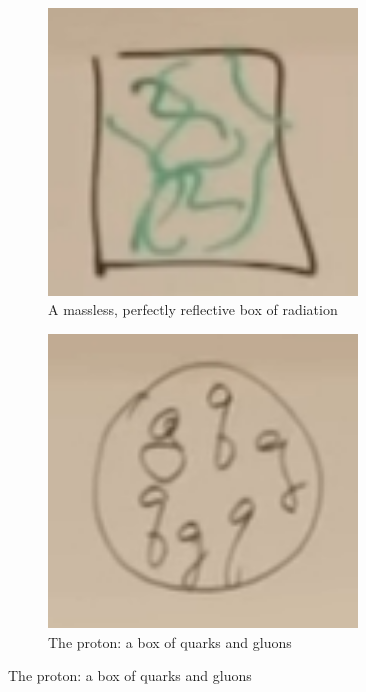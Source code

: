 \documentclass[]{article}
\begin{document}
\begin{figure}[H]
	\caption{How to get a mass}
	\begin{subfigure}[t]{0.45\textwidth}
		\caption{A massless, perfectly reflective box of radiation}\label{fig:2-a2-box-of-radiation}
		\includegraphics[width=0.9\textwidth]{2-a2-box-of-radiation}
	\end{subfigure}
	\begin{subfigure}[t]{0.45\textwidth}
		\caption{The proton: a box of quarks and gluons}\label{fig:2-a2-box-of-gluons}
		\includegraphics[width=0.9\textwidth]{2-a2-box-of-gluons}
	\end{subfigure}
\end{figure}
\end{document}

